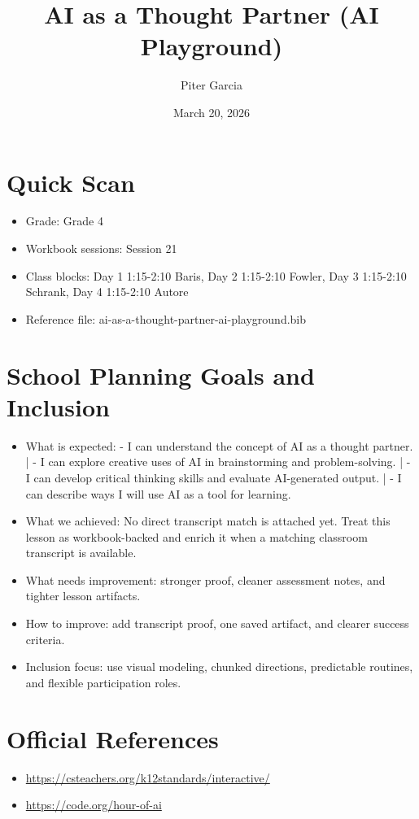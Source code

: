 \documentclass[11pt]{article}
\title{AI as a Thought Partner (AI Playground)}
\author{Piter Garcia}
\date{March 20, 2026}
\begin{document}
    \maketitle
    \section*{Quick Scan}
    \begin{itemize}[leftmargin=*]
    \item Grade: Grade 4
    \item Workbook sessions: Session 21
    \item Class blocks: Day 1 1:15-2:10 Baris, Day 2 1:15-2:10 Fowler, Day 3 1:15-2:10 Schrank, Day 4 1:15-2:10 Autore
    \item Reference file: ai-as-a-thought-partner-ai-playground.bib
    \end{itemize}
    \section*{School Planning Goals and Inclusion}
    \begin{itemize}[leftmargin=*]
    \item What is expected: - I can understand the concept of AI as a thought partner. | - I can explore creative uses of AI in brainstorming and problem-solving. | - I can develop critical thinking skills and evaluate AI-generated output. | - I can describe ways I will use AI as a tool for learning.
    \item What we achieved: No direct transcript match is attached yet. Treat this lesson as workbook-backed and enrich it when a matching classroom transcript is available.
    \item What needs improvement: stronger proof, cleaner assessment notes, and tighter lesson artifacts.
    \item How to improve: add transcript proof, one saved artifact, and clearer success criteria.
    \item Inclusion focus: use visual modeling, chunked directions, predictable routines, and flexible participation roles.
    \end{itemize}
    \section*{Official References}
    \begin{itemize}[leftmargin=*]
    \item \url{https://csteachers.org/k12standards/interactive/}
\item \url{https://code.org/hour-of-ai}

    \end{itemize}
    
\end{document}
